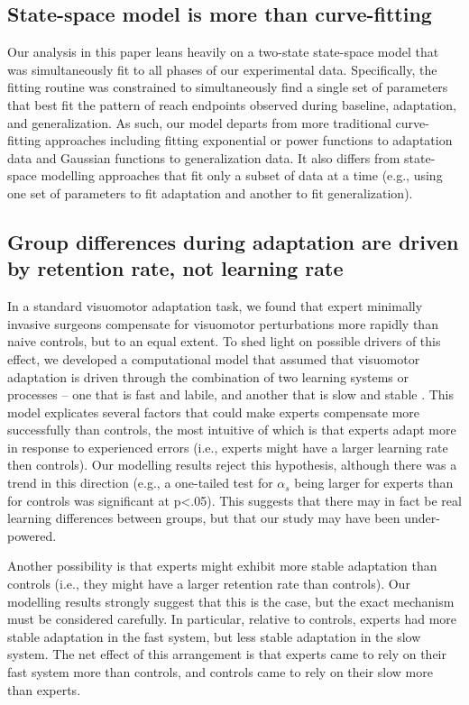 \documentclass[jou, 11pt, longtable, floatsintext, notab]{apa6}
\begin{document}
\subsection{State-space model is more than curve-fitting}
Our analysis in this paper leans heavily on a two-state
state-space model that was simultaneously fit to all phases
of our experimental data. Specifically, the fitting routine
was constrained to simultaneously find a single set of
parameters that best fit the pattern of reach endpoints
observed during baseline, adaptation, and generalization. As
such, our model departs from more traditional curve-fitting
approaches including fitting exponential or power functions
to adaptation data and Gaussian functions to generalization
data. It also differs from state-space modelling approaches
that fit only a subset of data at a time (e.g., using one
set of parameters to fit adaptation and another to fit
generalization).

\subsection{Group differences during adaptation are driven
  by retention rate, not learning rate}
In a standard visuomotor adaptation task, we found that
expert minimally invasive surgeons compensate for visuomotor
perturbations more rapidly than naive controls, but to an
equal extent. To shed light on possible drivers of this
effect, we developed a computational model that assumed that
visuomotor adaptation is driven through the combination of
two learning systems or processes -- one that is fast and
labile, and another that is slow and stable
\cite{smith_interacting_2006}. This model explicates several
factors that could make experts compensate more successfully
than controls, the most intuitive of which is that experts
adapt more in response to experienced errors (i.e., experts
might have a larger learning rate then controls). Our
modelling results reject this hypothesis, although there was
a trend in this direction (e.g., a one-tailed test for
$\alpha_s$ being larger for experts than for controls was
significant at p<.05). This suggests that there may in fact
be real learning differences between groups, but that our
study may have been under-powered.

Another possibility is that experts might exhibit more stable
adaptation than controls (i.e., they might have a larger
retention rate than controls). Our modelling results
strongly suggest that this is the case, but the exact
mechanism must be considered carefully. In particular,
relative to controls, experts had more stable adaptation in
the fast system, but less stable adaptation in the slow
system. The net effect of this arrangement is that experts
came to rely on their fast system more than controls, and
controls came to rely on their slow more than experts.
\end{document}
